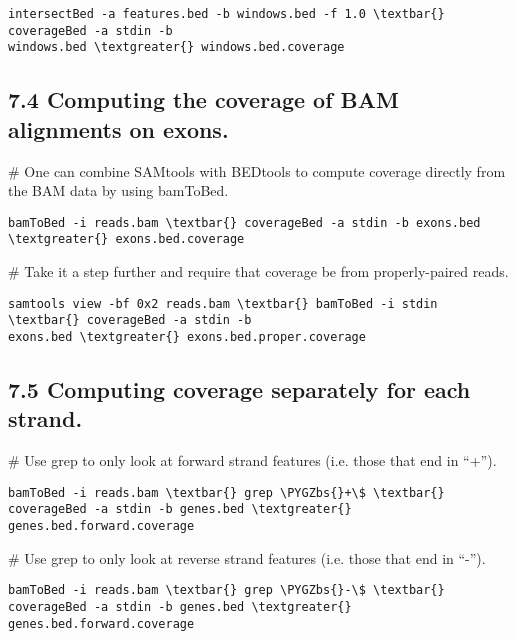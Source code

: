 \documentclass[letterpaper,10pt,english]{sphinxmanual}
\def\PYGZbs{\char`\\}
\begin{document}
\begin{Verbatim}[commandchars=\\\{\}]
intersectBed -a features.bed -b windows.bed -f 1.0 \textbar{} coverageBed -a stdin -b
windows.bed \textgreater{} windows.bed.coverage
\end{Verbatim}


\subsection{7.4 Computing the coverage of BAM alignments on exons.}
\label{content/advanced-usage:computing-the-coverage-of-bam-alignments-on-exons}
\# One can combine SAMtools with BEDtools to compute coverage directly from the BAM
data by using bamToBed.

\begin{Verbatim}[commandchars=\\\{\}]
bamToBed -i reads.bam \textbar{} coverageBed -a stdin -b exons.bed \textgreater{} exons.bed.coverage
\end{Verbatim}

\# Take it a step further and require that coverage be from properly-paired reads.

\begin{Verbatim}[commandchars=\\\{\}]
samtools view -bf 0x2 reads.bam \textbar{} bamToBed -i stdin \textbar{} coverageBed -a stdin -b
exons.bed \textgreater{} exons.bed.proper.coverage
\end{Verbatim}


\subsection{7.5 Computing coverage separately for each strand.}
\label{content/advanced-usage:computing-coverage-separately-for-each-strand}
\# Use grep to only look at forward strand features (i.e. those that end in ``+'').

\begin{Verbatim}[commandchars=\\\{\}]
bamToBed -i reads.bam \textbar{} grep \PYGZbs{}+\$ \textbar{} coverageBed -a stdin -b genes.bed \textgreater{}
genes.bed.forward.coverage
\end{Verbatim}

\# Use grep to only look at reverse strand features (i.e. those that end in ``-'').

\begin{Verbatim}[commandchars=\\\{\}]
bamToBed -i reads.bam \textbar{} grep \PYGZbs{}-\$ \textbar{} coverageBed -a stdin -b genes.bed \textgreater{}
genes.bed.forward.coverage
\end{Verbatim}
\end{document}
